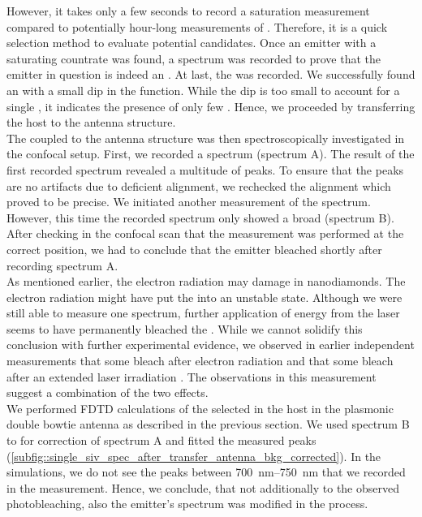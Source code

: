 			However, it takes only a few seconds to record a saturation measurement compared to potentially hour-long measurements of \gtfs.
			Therefore, it is a quick selection method to evaluate potential candidates.
			Once an emitter with a saturating countrate was found, a spectrum was recorded to prove that the emitter in question is indeed an \siv.
			At last, the \gtf was recorded.
			We successfully found an \siv with a small dip in the \gt function.
			While the dip is too small to account for a single \siv, it indicates the presence of only few \sivs.
			Hence, we proceeded by transferring the host \nd to the antenna structure.
			\\
			The \siv coupled to the antenna structure was then spectroscopically investigated in the confocal setup.
			First, we recorded a spectrum (spectrum A).
			The result of the first recorded spectrum revealed a multitude of peaks.
			To ensure that the peaks are no artifacts due to deficient alignment, we rechecked the alignment which proved to be precise.
			We initiated another measurement of the spectrum.
			However, this time the recorded spectrum only showed a broad \bkg (spectrum B).
			After checking in the confocal scan that the measurement was performed at the correct position, we had to conclude that the emitter bleached shortly after recording spectrum A.
			\\
			As mentioned earlier, the electron radiation may damage \sivs in nanodiamonds.
			The electron radiation might have put the \siv into an unstable state.
			Although we were still able to measure one spectrum, further application of energy from the laser seems to have permanently bleached the \siv.
			While we cannot solidify this conclusion with further experimental evidence, we observed in earlier independent measurements that some \sivs bleach after electron radiation and that some \sivs bleach after an extended laser irradiation \cite{}.
			The observations in this measurement suggest a combination of the two effects.
			\\
			We performed FDTD calculations of the selected \siv in the host \nd in the plasmonic double bowtie antenna as described in the previous section.
			We used spectrum B to for \bkg correction of spectrum A and fitted the measured peaks (\cref{subfig::single_siv_spec_after_transfer_antenna_bkg_corrected}).
			In the simulations, we do not see the peaks between \SIrange{700}{750}{nm} that we recorded in the measurement.
			Hence, we conclude, that not additionally to the observed photobleaching, also the emitter's spectrum was modified in the \pp process.
